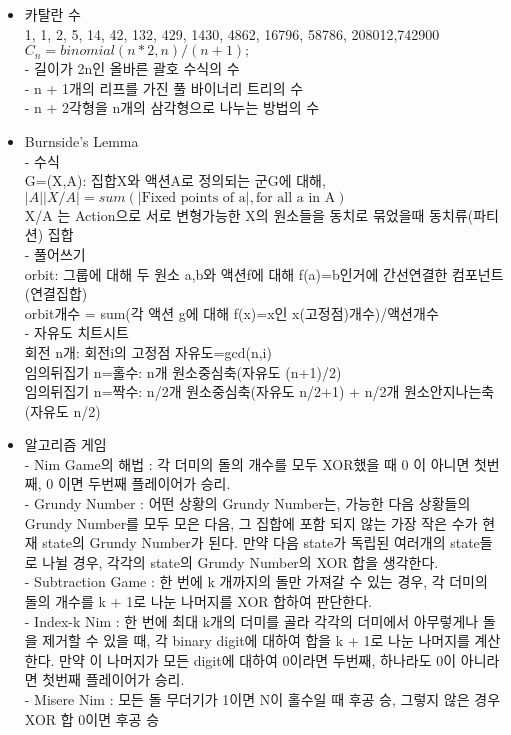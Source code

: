 \documentclass[landscape, 8pt, a4paper, oneside, twocolumn]{extarticle}
\begin{document}
{}{}{}{}{}
\begin{itemize}
\setlength\itemsep{0.1em}
    
\item 카탈란 수\\
1, 1, 2, 5, 14, 42, 132, 429, 1430, 4862, 16796, 58786, 208012,742900\\
$C_n = binomial(n * 2, n) / (n + 1);$\\
- 길이가 2n인 올바른 괄호 수식의 수\\
- n + 1개의 리프를 가진 풀 바이너리 트리의 수\\
- n + 2각형을 n개의 삼각형으로 나누는 방법의 수

\item Burnside’s Lemma\\
- 수식\\
G=(X,A): 집합X와 액션A로 정의되는 군G에 대해, $\vert A\vert\vert X/A \vert=sum(\vert \text{Fixed points of a}\vert,\text{for all a in A})$\\
X/A 는 Action으로 서로 변형가능한 X의 원소들을 동치로 묶었을때 동치류(파티션) 집합\\
- 풀어쓰기\\
orbit: 그룹에 대해 두 원소 a,b와 액션f에 대해 f(a)=b인거에 간선연결한 컴포넌트(연결집합)\\
orbit개수 = sum(각 액션 g에 대해 f(x)=x인 x(고정점)개수)/액션개수\\
- 자유도 치트시트\\
회전 n개: 회전i의 고정점 자유도=gcd(n,i)\\
임의뒤집기 n=홀수: n개 원소중심축(자유도 (n+1)/2)\\
임의뒤집기 n=짝수: n/2개 원소중심축(자유도 n/2+1) + n/2개 원소안지나는축(자유도 n/2)

\item 알고리즘 게임\\
- Nim Game의 해법 : 각 더미의 돌의 개수를 모두 XOR했을 때 0 이 아니면 첫번째, 0 이면 두번째 플레이어가 승리.\\
- Grundy Number : 어떤 상황의 Grundy Number는, 가능한 다음 상황들의 Grundy Number를 모두 모은 다음, 그 집합에 포함 되지 않는 가장 작은 수가 현재 state의 Grundy Number가 된다. 만약 다음 state가 독립된 여러개의 state들로 나뉠 경우, 각각의 state의 Grundy Number의 XOR 합을 생각한다.\\
- Subtraction Game : 한 번에 k 개까지의 돌만 가져갈 수 있는 경우, 각 더미의 돌의 개수를 k + 1로 나눈 나머지를 XOR 합하여 판단한다.\\
- Index-k Nim : 한 번에 최대 k개의 더미를 골라 각각의 더미에서 아무렇게나 돌을 제거할 수 있을 때, 각 binary digit에 대하여 합을 k + 1로 나눈 나머지를 계산한다. 만약 이 나머지가 모든 digit에 대하여 0이라면 두번째, 하나라도 0이 아니라면 첫번째 플레이어가 승리.\\
- Misere Nim : 모든 돌 무더기가 1이면 N이 홀수일 때 후공 승, 그렇지 않은 경우 XOR 합 0이면 후공 승


\end{itemize}
\end{document}
